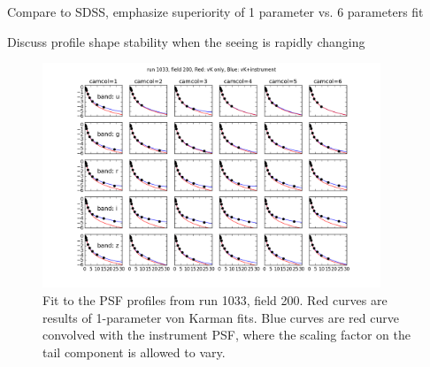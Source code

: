 

Compare to SDSS, emphasize superiority of 1 parameter vs. 6 parameters fit

Discuss profile shape stability when the seeing is rapidly  changing 

\begin{figure}
\centering
\includegraphics[width=0.9\textwidth]{FIGURES/psffit.png}
\caption{Fit to the PSF profiles from run 1033, field 200. Red curves
  are results of 1-parameter von Karman fits. Blue curves are red
  curve convolved with the instrument PSF, where the scaling factor on
  the tail component is allowed to vary.
\label{fig:psffit}}
\end{figure}
